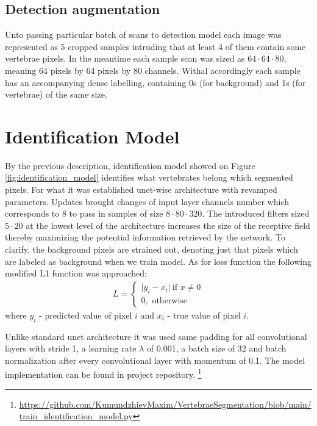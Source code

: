 \subsection{Detection augmentation}
Unto passing particular batch of scans to detection model each image was represented as 5 cropped samples intruding that at least 4 of them contain some vertebrae pixels. In the meantime each sample scan was sized as $64 \cdot 64 \cdot 80$, meaning 64 pixels by 64 pixels by 80 channels. Withal accordingly each sample has an accompanying dense labelling, containing 0s (for background) and 1s (for vertebrae) of the same size.    
 
\section{Identification Model}
By the previous description, identification model showed on Figure \ref{fig:identification_model} identifies what vertebrates belong which segmented pixels. For what it was established unet-wise architecture with revamped parameters. Updates brought changes of input layer channels number which corresponds to 8 to pass in samples of size $8 \cdot 80 \cdot 320$. The introduced filters sized $5 \cdot 20$ at the lowest level of the architecture  increases the size of the receptive field thereby maximizing the potential information retrieved by the network. To clarify, the background pixels are strained out, denoting just that pixels which are labeled as background when we train model. As for loss function the following modified L1 function was approached:
\begin{align*}
 L = \begin{cases} \lvert y_i - x_i \rvert\ \mbox{if } x\mbox{$\neq 0$} \\ 0, \mbox{ otherwise} \end{cases}
\end{align*}
where $y_i$ - predicted value of pixel $i$ and $x_i$ - true value of pixel $i$.

Unlike standard unet architecture it was used same padding for all convolutional layers with stride 1, a learning rate
$\lambda$ of 0.001, a batch size of 32 and batch normalization after every convolutional layer with momentum of 0.1. The model implementation can be found in project repository. \footnote{\url{https://github.com/KumundzhievMaxim/VertebraeSegmentation/blob/main/train_identification_model.py}}

